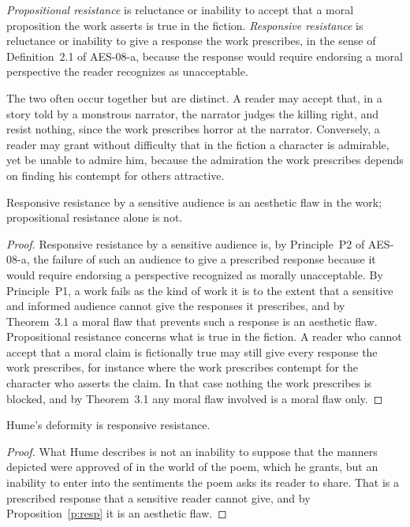 \documentclass{situationist-preprint}
\begin{document}
\begin{definition}\label{d:forms}
\emph{Propositional resistance} is reluctance or inability to accept that a moral proposition the work asserts is true in the fiction. \emph{Responsive resistance} is reluctance or inability to give a response the work prescribes, in the sense of Definition~2.1 of AES-08-a, because the response would require endorsing a moral perspective the reader recognizes as unacceptable.
\end{definition}

The two often occur together but are distinct. A reader may accept that, in a story told by a monstrous narrator, the narrator judges the killing right, and resist nothing, since the work prescribes horror at the narrator. Conversely, a reader may grant without difficulty that in the fiction a character is admirable, yet be unable to admire him, because the admiration the work prescribes depends on finding his contempt for others attractive.

\begin{proposition}\label{p:resp}
Responsive resistance by a sensitive audience is an aesthetic flaw in the work; propositional resistance alone is not.
\end{proposition}

\begin{proof}
Responsive resistance by a sensitive audience is, by Principle~P2 of AES-08-a, the failure of such an audience to give a prescribed response because it would require endorsing a perspective recognized as morally unacceptable. By Principle~P1, a work fails as the kind of work it is to the extent that a sensitive and informed audience cannot give the responses it prescribes, and by Theorem~3.1 a moral flaw that prevents such a response is an aesthetic flaw. Propositional resistance concerns what is true in the fiction. A reader who cannot accept that a moral claim is fictionally true may still give every response the work prescribes, for instance where the work prescribes contempt for the character who asserts the claim. In that case nothing the work prescribes is blocked, and by Theorem~3.1 any moral flaw involved is a moral flaw only.
\end{proof}

\begin{corollary}\label{c:hume}
Hume's deformity is responsive resistance.
\end{corollary}

\begin{proof}
What Hume describes is not an inability to suppose that the manners depicted were approved of in the world of the poem, which he grants, but an inability to enter into the sentiments the poem asks its reader to share. That is a prescribed response that a sensitive reader cannot give, and by Proposition~\ref{p:resp} it is an aesthetic flaw.
\end{proof}
\end{document}

